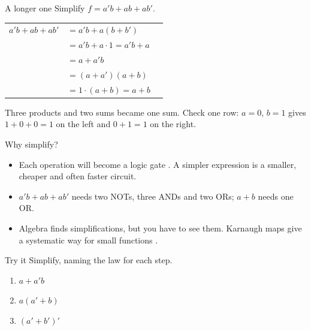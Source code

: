 \documentclass[10pt]{wosm-slides}
\makeatletter
\newenvironment{derivation}
  {\begin{tabular}{@{}r@{\;}l@{\qquad}l@{}}}
  {\end{tabular}}
\newcommand*\by[1]{\wosmlabel{#1}}
\makeatother
\begin{document}
\begin{frame}{A longer one}
  Simplify $f = a'b + ab + ab'$.

  \medskip
  \small
  \begin{derivation}
    $a'b + ab + ab'$ & $= a'b + a(b + b')$ & \by{distributivity} \\
                     & $= a'b + a \cdot 1 = a'b + a$ & \by{complement, identity} \\
                     & $= a + a'b$ & \by{commutativity} \\
                     & $= (a + a')(a + b)$ & \by{distributivity} \\
                     & $= 1 \cdot (a + b) = a + b$ & \by{complement, identity} \\
  \end{derivation}

  \medskip
  \normalsize
  Three products and two sums became one sum. Check one row: $a = 0$, $b = 1$ gives
  $1 + 0 + 0 = 1$ on the left and $0 + 1 = 1$ on the right.
\end{frame}

\begin{frame}{Why simplify?}
  \begin{itemize}
    \item Each operation will become a logic gate . A simpler expression
      is a smaller, cheaper and often faster circuit.
    \item $a'b + ab + ab'$ needs two NOTs, three ANDs and two ORs;
      $a + b$ needs one OR.
    \item Algebra finds simplifications, but you have to see them. Karnaugh maps
      give a systematic way for small functions .
  \end{itemize}
\end{frame}

\begin{frame}{Try it}
  Simplify, naming the law for each step.
  \begin{enumerate}
    \item $a + a'b$\par
    \item $a(a' + b)$\par
    \item $(a' + b')'$\par
  \end{enumerate}

\end{frame}
\end{document}
